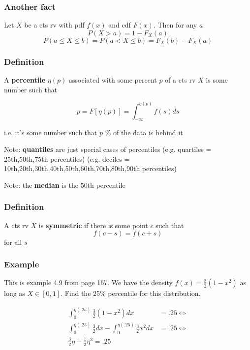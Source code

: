 \documentclass{beamer}
\begin{document}


\begin{frame}
\frametitle{Another fact}

Let $X$ be a cts rv with pdf $f(x)$ and cdf $F(x)$. Then for any $a$
\[
P(X > a) = 1 - F_X(a)
\]
\[
P(a \le X \le b) = P(a < X \le b) = F_X(b) - F_X(a)
\]
\end{frame}


\begin{frame}
\frametitle{Definition}

\begin{definition}
A \textbf{percentile} $\eta(p)$ associated with some percent $p$ of a cts rv $X$ is some number such that

\[
p = F[\eta(p)] = \int_{-\infty}^{\eta(p)} f(s)ds
\]
\end{definition}

i.e. it's some number such that $p$ \% of the data is behind it
\newline

Note: \textbf{quantiles} are just special cases of percentiles (e.g. quartiles = 25th,50th,75th percentiles) (e.g. deciles = 10th,20th,30th,40th,50th,60th,70th,80th,90th percentiles)
\newline

Note: the \textbf{median} is the 50th percentile
\end{frame}


\begin{frame}
\frametitle{Definition}

\begin{definition}
A cts rv $X$ is \textbf{symmetric} if there is some point $c$ such that
\[
f(c-s) = f(c+s)
\]
for all $s$
\end{definition}

\end{frame}




\begin{frame}
\frametitle{Example}

This is example 4.9 from page 167. We have the density $f(x) = \frac{3}{2}(1 - x^2)$ as long as $X \in [0,1]$. Find the 25\% percentile for this distribution.
\pause

\begin{align*}
\int_0^{\eta(.25)}\frac{3}{2}(1 - x^2)dx &= .25 \iff \\
\int_0^{\eta(.25)} \frac{3}{2} dx - \int_0^{\eta(.25)}\frac{3}{2}x^2 dx &= .25 \iff \\
\frac{3}{2} \eta - \frac{1}{2}\eta^3 = .25
\end{align*}


\end{frame}
\end{document}
